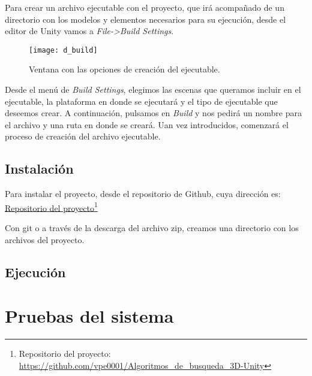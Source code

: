 Para crear un archivo ejecutable con el proyecto, que irá acompañado de un directorio con los modelos y elementos necesarios para su ejecución, desde el editor de Unity vamos a \textit{File-\textgreater Build Settings}.

\begin{figure}[htpb]
    \centering
    \texttt{[image: d\_build]}
    \caption[Menú de creación del ejecutable]{Ventana con las opciones de creación del ejecutable.}
    \label{fig:dbuild}
\end{figure}

Desde el menú de \textit{Build Settings}, elegimos las escenas que queramos incluir en el ejecutable, la plataforma en donde se ejecutará y el tipo de ejecutable que deseemos crear. A continuación, pulsamos en \textit{Build} y nos pedirá un nombre para el archivo y una ruta en donde se creará. Uan vez introducidos, comenzará el proceso de creación del archivo ejecutable.

\subsection{Instalación}
Para instalar el proyecto, desde el repositorio de Github, cuya dirección es:
\href{https://github.com/vpe0001/Algoritmos\_de\_busqueda\_3D-Unity}{Repositorio del proyecto}\footnote{Repositorio del proyecto: \url{https://github.com/vpe0001/Algoritmos\_de\_busqueda\_3D-Unity}}

Con git o a través de la descarga del archivo zip, creamos una directorio con los archivos del proyecto.

\subsection{Ejecución}

\section{Pruebas del sistema}
